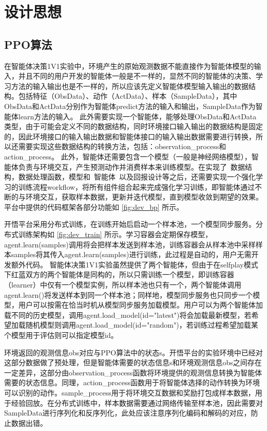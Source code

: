 \section{设计思想}

\subsection{PPO算法}


在智能体决策1V1实验中，环境产生的原始观测数据不能直接作为智能体模型的输入，并且不同的用户开发的智能体一般是不一样的，显然不同的智能体的决策、学习方法的输入输出也是不一样的，所以应该先定义智能体模型输入输出的数据结构。包括特征（ObsData）、动作（ActData）、样本（SampleData），其中ObsData和ActData分别作为智能体predict方法的输入和输出，SampleData作为智能体learn方法的输入。
此外需要实现一个智能体，能够处理ObsData和ActData类型，由于可能会定义不同的数据结构，同时环境接口输入输出的数据结构是固定的，因此环境接口的输入输出数据和智能体接口的输入输出数据需要进行转换，所以还需要实现这些数据结构的转换方法，包括：observation\_process和action\_process。
此外，智能体还需要包含一个模型（一般是神经网络模型），智能体负责与环境交互，产生预测动作并消费样本来训练模型。在实现了\ 数据结构，数据处理函数，模型和\ 智能体\ 以及回报设计等之后，还需要实现一个强化学习的训练流程workflow，将所有组件组合起来完成强化学习训练，即智能体通过不断的与环境交互，获取样本数据，更新并迭代模型，直到模型收敛到期望的效果。平台中提供的代码框架各部分功能如 \cref{fig:dev_bp} 所示。


开悟平台采用分布式训练，在训练开始后启动一个样本池，一个模型同步服务。分布式训练架构如 \cref{fig:dev_train} 所示。学习容器会定期保存模型，agent.learn(samples)调用将会把样本发送到样本池，训练容器会从样本池中采样样本samples将其传入agent.learn(samples)进行训练，此过程是自动的，用户无需开发额外代码。
智能体决策1V1实验虽然提供了两个智能体，但由于在selfplay模式下红蓝双方的两个智能体是同构的，所以只需训练一个模型，即训练容器（learner）中仅有一个模型实例，所以样本池也只有一个，两个智能体调用agent.learn()将发送样本到同一个样本池；同样地，模型同步服务也只同步一个模型，用户可以按需在恰当时机从模型同步服务加载模型。用户可以为两个智能体加载不同的历史模型，调用agent.load\_model(id="latest")将会加载最新模型，若希望加载随机模型则调用agent.load\_model(id="random")，若训练过程希望加载某个模型用于评估则可以指定模型id。


环境返回的观测信息obs对应与PPO算法中的状态s。开悟平台的实验环境中已经对这部分数据做了预处理，但是智能体需要的状态信息s和环境观测信息obs之间存在一定差异，这部分由observation\_process函数将环境提供的观测信息转换为智能体需要的状态信息。同理，action\_process函数用于将智能体选择的动作转换为环境可以识别的动作。sample\_process用于将环境交互数据和奖励打包成样本数据，用于经验回放。在分布式训练中，样本数据需要通过网络传输至样本池，因此需要对SampleData进行序列化和反序列化，此处应该注意序列化编码和解码的对应，防止数据出错。


